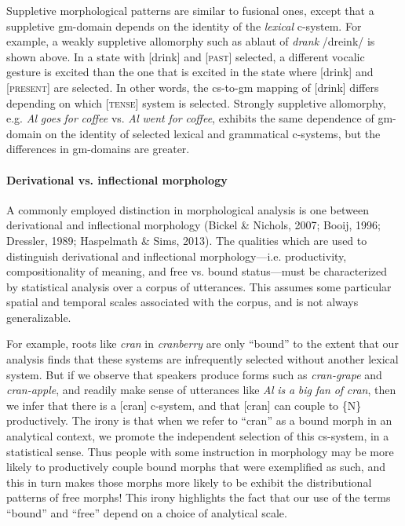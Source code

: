   Suppletive morphological patterns are similar to fusional ones, except that a suppletive gm-domain depends on the identity of the \textit{lexical} c-system. For example, a weakly suppletive allomorphy such as ablaut of \textit{drank} /dreink/ is shown above. In a state with [drink] and [\textsc{past}] selected, a different vocalic gesture is excited than the one that is excited in the state where [drink] and [\textsc{present}] are selected. In other words, the cs-to-gm mapping of [drink] differs depending on which [\textsc{tense}] system is selected. Strongly suppletive allomorphy, e.g. \textit{Al} \textit{goes} \textit{for} \textit{coffee} vs. \textit{Al} \textit{went} \textit{for} \textit{coffee}, exhibits the same dependence of gm-domain on the identity of selected lexical and grammatical c-systems, but the differences in gm-domains are greater.

\paragraph{Derivational vs. inflectional morphology}

A commonly employed distinction in morphological analysis is one between derivational and inflectional morphology (Bickel \& Nichols, 2007; Booij, 1996; Dressler, 1989; Haspelmath \& Sims, 2013). The qualities which are used to distinguish derivational and inflectional morphology—i.e. productivity, compositionality of meaning, and free vs. bound status—must be characterized by statistical analysis over a corpus of utterances. This assumes some particular spatial and temporal scales associated with the corpus, and is not always generalizable. 

  For example, roots like \textit{cran} in \textit{cranberry} are only “bound” to the extent that our analysis finds that these systems are infrequently selected without another lexical system. But if we observe that speakers produce forms such as \textit{cran-grape} and \textit{cran-apple}, and readily make sense of utterances like \textit{Al} \textit{is} \textit{a} \textit{big} \textit{fan} \textit{of} \textit{cran}, then we infer that there is a [cran] c-system, and that [cran] can couple to \{N\} productively. The irony is that when we refer to “cran” as a bound morph in an analytical context, we promote the independent selection of this cs-system, in a statistical sense. Thus people with some instruction in morphology may be more likely to productively couple bound morphs that were exemplified as such, and this in turn makes those morphs more likely to be exhibit the distributional patterns of free morphs! This irony highlights the fact that our use of the terms “bound” and “free” depend on a choice of analytical scale.

